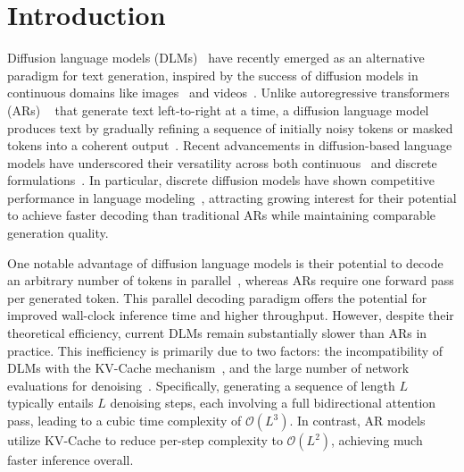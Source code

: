 \documentclass{article}
\begin{document}
\section{Introduction}
Diffusion language models (DLMs)~\cite{austin2021structured,hoogeboom2021argmax} have recently emerged as an alternative paradigm for text generation, inspired by the success of diffusion models in continuous domains like images~\cite{esser2024scaling,xie2025sana} and videos~\cite{kong2024hunyuanvideo,videoworldsimulators2024sora}. Unlike autoregressive transformers (ARs) ~\cite{Dubey2024TheL3,Yang2024Qwen25TR,DeepSeekAI2024DeepSeekV3TR} that generate text left-to-right at a time, a diffusion language model produces text by gradually refining a sequence of initially noisy tokens or masked tokens into a coherent output~\cite{ho2020ddpm,li2022diffusion}.
Recent advancements in diffusion-based language models have underscored their versatility across both continuous~\cite{han2022ssd} and discrete formulations~\cite{sahoo2024simple,austin2021structured}. In particular, discrete diffusion models have shown competitive performance in language modeling~\cite{nie2025llada}, attracting growing interest for their potential to achieve faster decoding than traditional ARs while maintaining comparable generation quality.

One notable advantage of diffusion language models is their potential to decode an arbitrary number of tokens in parallel~\cite{xu2025energybased}, whereas ARs require one forward pass per generated token. This parallel decoding paradigm offers the potential for improved wall-clock inference time and higher throughput. However, despite their theoretical efficiency, current DLMs remain substantially slower than ARs in practice. This inefficiency is primarily due to two factors: the incompatibility of DLMs with the KV-Cache mechanism~\cite{lou2023discrete,deschenaux2024promises}, and the large number of network evaluations for denoising~\cite{Feng2025TheoreticalBA}. Specifically, generating a sequence of length $L$ typically entails $L$ denoising steps, each involving a full bidirectional attention pass, leading to a cubic time complexity of $\mathcal{O}(L^3)$. In contrast, AR models utilize KV-Cache to reduce per-step complexity to $\mathcal{O}(L^2)$, achieving much faster inference overall.
\end{document}
